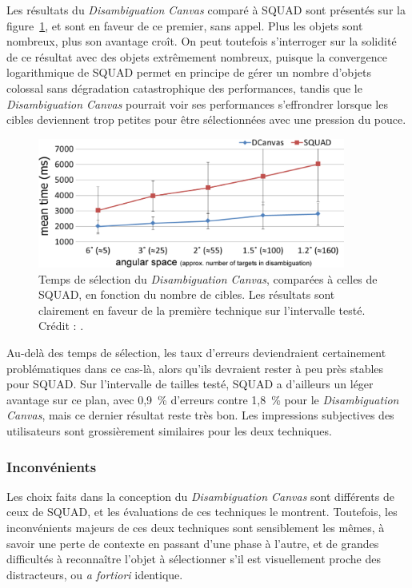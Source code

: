 	Les résultats du \emph{Disambiguation Canvas} comparé à SQUAD sont présentés sur la figure~\ref{fig:dCanvasSPerf}, et sont en faveur de ce premier, sans appel. Plus les objets sont nombreux, plus son avantage croît. On peut toutefois s'interroger sur la solidité de ce résultat avec des objets extrêmement nombreux, puisque la convergence logarithmique de SQUAD permet en principe de gérer un nombre d'objets colossal sans dégradation catastrophique des performances, tandis que le \emph{Disambiguation Canvas} pourrait voir ses performances s'effrondrer lorsque les cibles deviennent trop petites pour être sélectionnées avec une pression du pouce.	
	
	\begin{figure}[!htb]
		\centering
		\includegraphics[width=0.90\textwidth]{figures/ch2/dCanvasSPerf}
		\caption[\emph{Disambiguation Canvas} -- performances II]{Temps de sélection du \emph{Disambiguation Canvas}, comparées à celles de SQUAD, en fonction du nombre de cibles. Les résultats sont clairement en faveur de la première technique sur l'intervalle testé. Crédit : \cite{debarba2013disambiguation}.}
		\label{fig:dCanvasSPerf}
	\end{figure}
	
	Au-delà des temps de sélection, les taux d'erreurs deviendraient certainement problématiques dans ce cas-là, alors qu'ils devraient rester à peu près stables pour SQUAD. Sur l'intervalle de tailles testé, SQUAD a d'ailleurs un léger avantage sur ce plan, avec 0,9~\%{} d'erreurs contre 1,8~\%{} pour le \emph{Disambiguation Canvas}, mais ce dernier résultat reste très bon. Les impressions subjectives des utilisateurs sont grossièrement similaires pour les deux techniques.
		 
	\subsubsection{Inconvénients}
	Les choix faits dans la conception du \emph{Disambiguation Canvas} sont différents de ceux de SQUAD, et les évaluations de ces techniques le montrent. Toutefois, les inconvénients majeurs de ces deux techniques sont sensiblement les mêmes, à savoir une perte de contexte en passant d'une phase à l'autre, et de grandes difficultés à reconnaître l'objet à sélectionner s'il est visuellement proche des distracteurs, ou \emph{a fortiori} identique.
	
